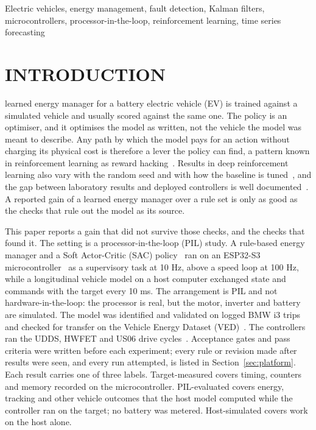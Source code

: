 \documentclass{ieeeaccess}
\begin{document}
\begin{keywords}
Electric vehicles, energy management, fault detection, Kalman filters, microcontrollers, processor-in-the-loop, reinforcement learning, time series forecasting
\end{keywords}

\titlepgskip=-21pt

\maketitle

\section{INTRODUCTION}
\label{sec:intro}

 learned energy manager for a battery electric vehicle (EV) is trained against a simulated vehicle and usually scored against the same one. The policy is an optimiser, and it optimises the model as written, not the vehicle the model was meant to describe. Any path by which the model pays for an action without charging its physical cost is therefore a lever the policy can find, a pattern known in reinforcement learning as reward hacking~\cite{amodei2016}. Results in deep reinforcement learning also vary with the random seed and with how the baseline is tuned~\cite{henderson2018}, and the gap between laboratory results and deployed controllers is well documented~\cite{dulac2021}. A reported gain of a learned energy manager over a rule set is only as good as the checks that rule out the model as its source.

This paper reports a gain that did not survive those checks, and the checks that found it. The setting is a processor-in-the-loop (PIL) study. A rule-based energy manager and a Soft Actor-Critic (SAC) policy~\cite{haarnoja2018} ran on an ESP32-S3 microcontroller~\cite{esp32s3} as a supervisory task at 10 Hz, above a speed loop at 100 Hz, while a longitudinal vehicle model on a host computer exchanged state and commands with the target every 10 ms. The arrangement is PIL and not hardware-in-the-loop: the processor is real, but the motor, inverter and battery are simulated. The model was identified and validated on logged BMW i3 trips~\cite{i3data} and checked for transfer on the Vehicle Energy Dataset (VED)~\cite{ved}. The controllers ran the UDDS, HWFET and US06 drive cycles~\cite{epacycles}. Acceptance gates and pass criteria were written before each experiment; every rule or revision made after results were seen, and every run attempted, is listed in Section~\ref{sec:platform}. Each result carries one of three labels. Target-measured covers timing, counters and memory recorded on the microcontroller. PIL-evaluated covers energy, tracking and other vehicle outcomes that the host model computed while the controller ran on the target; no battery was metered. Host-simulated covers work on the host alone.
\end{document}
